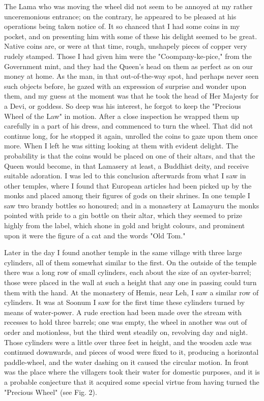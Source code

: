 \documentclass[a4paper, 11pt, oneside, polutonikogreek, english]{article}
\begin{document}
The Lama who was moving the wheel did not seem to be annoyed at my rather unceremonious entrance; on the contrary, he appeared to be pleased at his operations being taken notice of. It so chanced that I had some coins in my pocket, and on presenting him with some of these his delight seemed to be great. Native coins are, or were at that time, rough, unshapely pieces of copper very rudely stamped. Those I had given him were the "Coompany-ke-pice," from the Government mint, and they had the Queen's head on them as perfect as on our money at home. As the man, in that out-of-the-way spot, had perhaps never seen such objects before, he gazed with an expression of surprise and wonder upon them, and my guess at the moment was that he took the head of Her Majesty for a Devi, or goddess. So deep was his interest, he forgot to keep the "Precious Wheel of the Law" in motion. After a close inspection he wrapped them up carefully in a part of his dress, and commenced to turn the wheel. That did not continue long, for he stopped it again, unrolled the coins to gaze upon them once more. When I left he was sitting looking at them with evident delight. The probability is that the coins would be placed on one of their altars, and that the Queen would become, in that Lamasery at least, a Buddhist deity, and receive suitable adoration. I was led to this conclusion afterwards from what I saw in other temples, where I found that European articles had been picked up by the monks and placed among their figures of gods on their shrines. In one temple I saw two brandy bottles so honoured; and in a monastery at Lamayuru the monks pointed with pride to a gin bottle on their altar, which they seemed to prize highly from the label, which shone in gold and bright colours, and prominent upon it were the figure of a cat and the words "Old Tom."

Later in the day I found another temple in the same village with three large cylinders, all of them somewhat similar to the first. On the outside of the temple there was a long row of small cylinders, each about the size of an oyster-barrel; those were placed in the wall at such a height that any one in passing could turn them with the hand. At the monastery of Hemis, near Leh, I saw a similar row of cylinders. It was at Soonum I saw for the first time these cylinders turned by means of water-power. A rude erection had been made over the stream with recesses to hold three barrels; one was empty, the wheel in another was out of order and motionless, but the third went steadily on, revolving day and night. Those cylinders were a little over three feet in height, and the wooden axle was continued downwards, and pieces of wood were fixed to it, producing a horizontal paddle-wheel, and the water dashing on it caused the circular motion. In front was the place where the villagers took their water for domestic purposes, and it is a probable conjecture that it acquired some special virtue from having turned the "Precious Wheel" (see Fig. 2).
\end{document}
